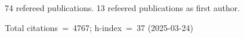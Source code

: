 74 refereed publications. 13 refeered publications as first author.

Total citations~=~4767; h-index~=~37 (2025-03-24)
